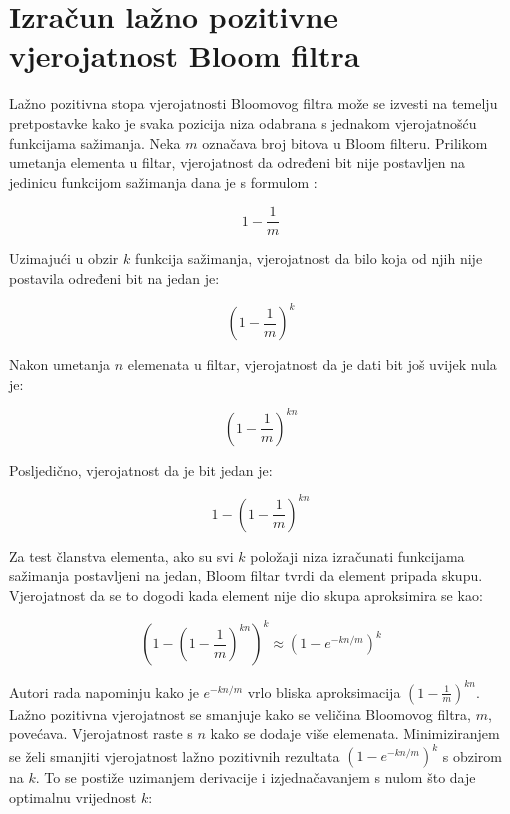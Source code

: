 \documentclass{foi}
\begin{document}
\section{Izračun lažno pozitivne vjerojatnost Bloom filtra}

Lažno pozitivna stopa vjerojatnosti Bloomovog filtra može se izvesti na temelju pretpostavke kako je svaka pozicija niza odabrana s jednakom vjerojatnošću funkcijama sažimanja. Neka $m$ označava broj bitova u Bloom filteru. Prilikom umetanja elementa u filtar, vjerojatnost da određeni bit nije postavljen na jedinicu funkcijom sažimanja dana je s formulom \cite{tarkoma2011theory}:

\begin{equation}\label{prva_formula}
    1- \frac{1}{m}
\end{equation}

Uzimajući u obzir $k$ funkcija sažimanja, vjerojatnost da bilo koja od njih nije postavila određeni bit na jedan je:

\begin{equation}\label{druga_formula}
    \left( 1- \frac{1}{m} \right)^k
\end{equation}

Nakon umetanja $n$ elemenata u filtar, vjerojatnost da je dati bit još uvijek nula je:

\begin{equation}\label{treca_formula}
    \left( 1- \frac{1}{m} \right)^{kn}
\end{equation}

Posljedično, vjerojatnost da je bit jedan je:

\begin{equation}\label{cetvrta_formula}
    1-\left( 1- \frac{1}{m} \right)^{kn}
\end{equation}

Za test članstva elementa, ako su svi $k$ položaji niza izračunati funkcijama sažimanja postavljeni na jedan, Bloom filtar tvrdi da element pripada skupu. Vjerojatnost da se to dogodi kada element nije dio skupa aproksimira se kao:

\begin{equation}\label{peta_formula}
    \left( 1-\left( 1- \frac{1}{m} \right)^{kn}\right)^k \approx \left( 1- e^{-kn/m} \right)^k
\end{equation}

Autori rada napominju kako je $e^{-kn/m}$ vrlo bliska aproksimacija $ \left( 1- \frac{1}{m} \right)^{kn} $. Lažno pozitivna vjerojatnost se smanjuje kako se veličina Bloomovog filtra, $m$, povećava. Vjerojatnost raste s $n$ kako se dodaje više elemenata. Minimiziranjem se želi smanjiti vjerojatnost lažno pozitivnih rezultata $\left( 1- e^{-kn/m} \right)^k$ s obzirom na $k$. To se postiže uzimanjem derivacije i izjednačavanjem s nulom što daje optimalnu vrijednost $k$:
\end{document}
